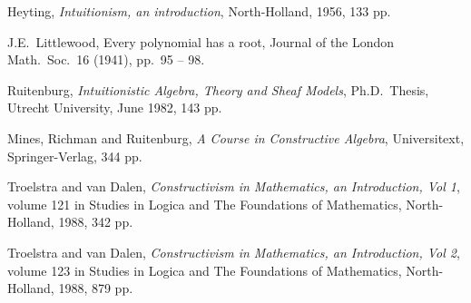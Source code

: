 \begin{thebibliography}{10}

Heyting, {\em Intuitionism, an introduction}, North-Holland, 1956, 133
pp.

J.E.\ Littlewood,
Every polynomial has a root, Journal of the London Math.\ Soc.\ 16
(1941), pp.\ 95 -- 98.

Ruitenburg, {\em Intuitionistic Algebra, Theory and Sheaf Models},
Ph.D.\ Thesis, Utrecht University, June 1982, 143 pp.

Mines, Richman and Ruitenburg, {\em A Course in Constructive Algebra},
Universitext, Springer-Verlag, 344 pp.

Troelstra and van Dalen, {\em Constructivism in Mathematics, an
Introduction, Vol 1}, volume 121 in Studies in Logica and The
Foundations of Mathematics, North-Holland, 1988, 342 pp.

Troelstra and van Dalen, {\em Constructivism in Mathematics, an
Introduction, Vol 2}, volume 123 in Studies in Logica and The
Foundations of Mathematics, North-Holland, 1988, 879 pp.

\end{thebibliography}

